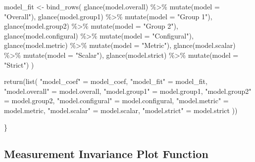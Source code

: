 \documentclass[
  man]{apa7}
\newenvironment{Shaded}{\begin{snugshade}}{\end{snugshade}}
\newcommand{\AttributeTok}[1]{\textcolor[rgb]{0.77,0.63,0.00}{#1}}
\newcommand{\FunctionTok}[1]{\textcolor[rgb]{0.00,0.00,0.00}{#1}}
\newcommand{\NormalTok}[1]{#1}
\newcommand{\OtherTok}[1]{\textcolor[rgb]{0.56,0.35,0.01}{#1}}
\newcommand{\SpecialCharTok}[1]{\textcolor[rgb]{0.00,0.00,0.00}{#1}}
\newcommand{\StringTok}[1]{\textcolor[rgb]{0.31,0.60,0.02}{#1}}
\begin{document}
\begin{Shaded}
\begin{Highlighting}[]
\NormalTok{  model\_fit }\OtherTok{\textless{}{-}} \FunctionTok{bind\_rows}\NormalTok{(}
    \FunctionTok{glance}\NormalTok{(model.overall) }\SpecialCharTok{\%\textgreater{}\%} \FunctionTok{mutate}\NormalTok{(}\AttributeTok{model =} \StringTok{"Overall"}\NormalTok{), }
    \FunctionTok{glance}\NormalTok{(model.group1) }\SpecialCharTok{\%\textgreater{}\%} \FunctionTok{mutate}\NormalTok{(}\AttributeTok{model =} \StringTok{"Group 1"}\NormalTok{), }
    \FunctionTok{glance}\NormalTok{(model.group2) }\SpecialCharTok{\%\textgreater{}\%} \FunctionTok{mutate}\NormalTok{(}\AttributeTok{model =} \StringTok{"Group 2"}\NormalTok{), }
    \FunctionTok{glance}\NormalTok{(model.configural) }\SpecialCharTok{\%\textgreater{}\%} \FunctionTok{mutate}\NormalTok{(}\AttributeTok{model =} \StringTok{"Configural"}\NormalTok{), }
    \FunctionTok{glance}\NormalTok{(model.metric) }\SpecialCharTok{\%\textgreater{}\%} \FunctionTok{mutate}\NormalTok{(}\AttributeTok{model =} \StringTok{"Metric"}\NormalTok{), }
    \FunctionTok{glance}\NormalTok{(model.scalar) }\SpecialCharTok{\%\textgreater{}\%} \FunctionTok{mutate}\NormalTok{(}\AttributeTok{model =} \StringTok{"Scalar"}\NormalTok{), }
    \FunctionTok{glance}\NormalTok{(model.strict) }\SpecialCharTok{\%\textgreater{}\%} \FunctionTok{mutate}\NormalTok{(}\AttributeTok{model =} \StringTok{"Strict"}\NormalTok{)}
\NormalTok{    )}
  
  \FunctionTok{return}\NormalTok{(}\FunctionTok{list}\NormalTok{(}
    \StringTok{"model\_coef"} \OtherTok{=}\NormalTok{ model\_coef,}
    \StringTok{"model\_fit"} \OtherTok{=}\NormalTok{ model\_fit,}
    \StringTok{"model.overall"} \OtherTok{=}\NormalTok{ model.overall,}
    \StringTok{"model.group1"} \OtherTok{=}\NormalTok{ model.group1,}
    \StringTok{"model.group2"} \OtherTok{=}\NormalTok{ model.group2,}
    \StringTok{"model.configural"} \OtherTok{=}\NormalTok{ model.configural,}
    \StringTok{"model.metric"} \OtherTok{=}\NormalTok{ model.metric,}
    \StringTok{"model.scalar"} \OtherTok{=}\NormalTok{ model.scalar,}
    \StringTok{"model.strict"} \OtherTok{=}\NormalTok{ model.strict}
\NormalTok{  ))}
  
\NormalTok{\}}
\end{Highlighting}
\end{Shaded}

\normalsize

\hypertarget{measurement-invariance-plot-function}{%
\subsection{Measurement Invariance Plot Function}\label{measurement-invariance-plot-function}}
\end{document}
